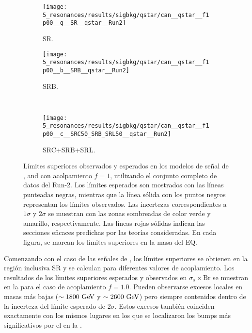 \begin{figure}[ht!]
    \centering
    \begin{subfigure}[t]{0.49\linewidth}
        \centering
        \texttt{[image: 5\_resonances/results/sigbkg/qstar/can\_\_qstar\_\_f1p00\_\_q\_\_SR\_\_qstar\_\_Run2]}
        \caption{SR.}
        \label{fig:results:results:bkgsig:results:qstar:limits:SR}
    \end{subfigure}
    \hfill
    \begin{subfigure}[t]{0.49\linewidth}
        \centering
        \texttt{[image: 5\_resonances/results/sigbkg/qstar/can\_\_qstar\_\_f1p00\_\_b\_\_SRB\_\_qstar\_\_Run2]}
        \caption{SRB.}
        \label{fig:results:results:bkgsig:results:qstar:limits:SRB}
    \end{subfigure}\\
    \begin{subfigure}[t]{0.49\linewidth}
        \centering
        \texttt{[image: 5\_resonances/results/sigbkg/qstar/can\_\_qstar\_\_f1p00\_\_c\_\_SRC50\_SRB\_SRL50\_\_qstar\_\_Run2]}
        \caption{SRC+SRB+SRL.}
        \label{fig:results:results:bkgsig:results:qstar:limits:SRC}
    \end{subfigure}
    \caption{Límites superiores observados y esperados en los modelos de señal de \qstar, \cstar and \bstar con acolpamiento \(f=1\), utilizando el conjunto completo de datos del Run-2. Los límites esperados son mostrados con las líneas punteadas negras, mientras que la línea sólida con los puntos negros representan los límites observados. Las incertezas correspondientes a \(1\sigma\) y \(2\sigma\) se muestran con las zonas sombreadas de color verde y amarillo, respectivamente. Las líneas rojas sólidas indican las secciones eficaces predichas por las teorías consideradas. En cada figura, se marcan los límites superiores en la masa del \ac{EQ}.}
    \label{fig:results:results:bkgsig:results:qstar:limits}
\end{figure}

Comenzando con el caso de las señales de \qstar, los límites superiores se obtienen en la región inclusiva SR y se calculan para diferentes valores de acoplamiento. Los resultados de los límites superiores esperados y observados en \(\sigma_s \times \text{Br}\) se muestran en la \Fig{\ref{fig:results:results:bkgsig:results:qstar:limits:SR}} para el caso de acoplamiento \(f=1.0\). Pueden observarse excesos locales en masas más bajas (\(\sim 1800~\text{GeV}\) y \(\sim 2600~\text{GeV}\)) pero siempre contenidos dentro de la incerteza del límite esperado de \(2\sigma\). Estos excesos también coinciden exactamente con los mismos lugares en los que se localizaron los bumps más significativos por el \bh en la \Fig{\ref{fig:results:results:bkgonly:fits:SR}}.

